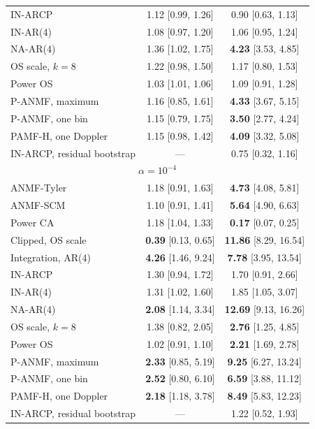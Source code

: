 \documentclass[10pt]{article}
\begin{document}
\begin{table}[htbp]
\begin{tabular}{lcc}
IN-ARCP & 1.12 [0.99, 1.26] & 0.90 [0.63, 1.13] \\
IN-AR(4) & 1.08 [0.97, 1.20] & 1.06 [0.95, 1.24] \\
NA-AR(4) & 1.36 [1.02, 1.75] & \textbf{4.23} [3.53, 4.85] \\
OS scale, $k=8$ & 1.22 [0.98, 1.50] & 1.17 [0.80, 1.53] \\
Power OS & 1.03 [1.01, 1.06] & 1.09 [0.91, 1.28] \\
P-ANMF, maximum & 1.16 [0.85, 1.61] & \textbf{4.33} [3.67, 5.15] \\
P-ANMF, one bin & 1.15 [0.79, 1.75] & \textbf{3.50} [2.77, 4.24] \\
PAMF-H, one Doppler & 1.15 [0.98, 1.42] & \textbf{4.09} [3.32, 5.08] \\
IN-ARCP, residual bootstrap & --- & 0.75 [0.32, 1.16] \\
\midrule\multicolumn{3}{c}{$\alpha=10^{-4}$}\\
ANMF-Tyler & 1.18 [0.91, 1.63] & \textbf{4.73} [4.08, 5.81] \\
ANMF-SCM & 1.10 [0.91, 1.41] & \textbf{5.64} [4.90, 6.63] \\
Power CA & 1.18 [1.04, 1.33] & \textbf{0.17} [0.07, 0.25] \\
Clipped, OS scale & \textbf{0.39} [0.13, 0.65] & \textbf{11.86} [8.29, 16.54] \\
Integration, AR(4) & \textbf{4.26} [1.46, 9.24] & \textbf{7.78} [3.95, 13.54] \\
IN-ARCP & 1.30 [0.94, 1.72] & 1.70 [0.91, 2.66] \\
IN-AR(4) & 1.31 [1.02, 1.60] & 1.85 [1.05, 3.07] \\
NA-AR(4) & \textbf{2.08} [1.14, 3.34] & \textbf{12.69} [9.13, 16.26] \\
OS scale, $k=8$ & 1.38 [0.82, 2.05] & \textbf{2.76} [1.25, 4.85] \\
Power OS & 1.02 [0.91, 1.10] & \textbf{2.21} [1.69, 2.78] \\
P-ANMF, maximum & \textbf{2.33} [0.85, 5.19] & \textbf{9.25} [6.27, 13.24] \\
P-ANMF, one bin & \textbf{2.52} [0.80, 6.10] & \textbf{6.59} [3.88, 11.12] \\
PAMF-H, one Doppler & \textbf{2.18} [1.18, 3.78] & \textbf{8.49} [5.83, 12.23] \\
IN-ARCP, residual bootstrap & --- & 1.22 [0.52, 1.93] \\
\bottomrule
\end{tabular}
\end{table}
\end{document}
